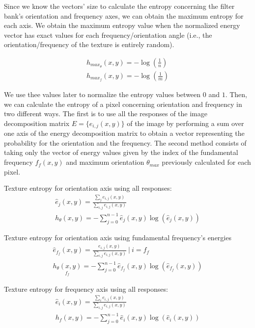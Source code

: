 Since we know the vectors' size to calculate the entropy concerning the filter bank's orientation and frequency axes, we can obtain the maximum entropy for each axis. We obtain the maximum entropy value when the normalized energy vector has exact values for each frequency/orientation angle (i.e., the orientation/frequency of the texture is entirely random).

\begin{gather}
    h_{max_{\theta}}(x,y) = -\log\left(\frac{1}{n}\right) \label{eq:max_entropy_orient} \\
    h_{max_f}(x,y) = -\log\left(\frac{1}{m}\right) \label{eq:max_entropy_freq}
\end{gather}

We use thee values later to normalize the entropy values between $0$ and $1$. Then, we can calculate the entropy of a pixel concerning orientation and frequency in two different ways. The first is to use all the responses of the image decomposition matrix  $E = \lbrace  e_{i,j}(x,y) \rbrace$ of the image by performing a sum over one axis of the energy decomposition matrix to obtain a vector representing the probability for the orientation and the frequency. The second method consists of taking only the vector of energy values given by the index of the fundamental frequency $f_f(x,y)$ and maximum orientation $\theta_{max}$ previously calculated for each pixel.

Texture entropy for orientation axis using all responses:
\begin{gather}
    \hat{e}_{j}(x,y) = \frac{\sum_{j} e_{i,j}(x,y)}{ \sum_{i,j} e_{i,j}(x,y)}\\	
    h_{\theta}(x,y) = -\sum_{j=0}^{n-1} \hat{e}_{j}(x,y)  \log (\hat{e}_{j}(x,y)) \label{eq:entropy_orient}
\end{gather}


Texture entropy for orientation axis using fundamental frequency's energies
\begin{gather}
    \hat{e}_{f_{f}}(x,y) = \frac{e_{i,j}(x,y)}{ \sum_{i,j} e_{i,j}(x,y)} ~|~ i = f_{f}\\	
    \underset{f_{f}}{h_{\theta}(x,y)} = -\sum_{j=0}^{n-1} \hat{e}_{f_{f}}(x,y)  \log (\hat{e}_{f_{f}}(x,y))  \label{eq:entropy_fund_freq}
\end{gather}

Texture entropy for frequency axis using all responses:
\begin{gather}
    \hat{e}_{i}(x,y) = \frac{\sum_{i} e_{i,j}(x,y)}{ \sum_{i,j} e_{i,j}(x,y)}\\	
    h_f(x,y) = -\sum_{j=0}^{n-1} \hat{e}_{i}(x,y)  \log (\hat{e}_{i}(x,y))  \label{eq:entropy_freq}
\end{gather}

